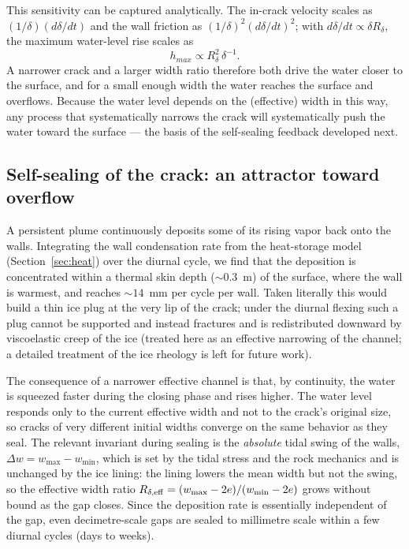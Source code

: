 \documentclass[draft]{agujournal2019}
\begin{document}
This sensitivity can be captured analytically. The in-crack velocity scales as $(1/\delta)(d\delta/dt)$ and the wall friction as $(1/\delta)^2(d\delta/dt)^2$; with $d\delta/dt\propto\delta R_\delta$, the maximum water-level rise scales as
\begin{equation}
    h_{max}\propto R_\delta^{2}\,\delta^{-1}.
    \label{eq:hmax_scaling}
\end{equation}
A narrower crack and a larger width ratio therefore both drive the water closer to the surface, and for a small enough width the water reaches the surface and overflows. Because the water level depends on the (effective) width in this way, any process that systematically narrows the crack will systematically push the water toward the surface --- the basis of the self-sealing feedback developed next.

\subsection{Self-sealing of the crack: an attractor toward overflow}
\label{sec:attractor}
A persistent plume continuously deposits some of its rising vapor back onto the walls. Integrating the wall condensation rate from the heat-storage model (Section~\ref{sec:heat}) over the diurnal cycle, we find that the deposition is concentrated within a thermal skin depth (${\sim}0.3$~m) of the surface, where the wall is warmest, and reaches ${\sim}14$~mm per cycle per wall. Taken literally this would build a thin ice plug at the very lip of the crack; under the diurnal flexing such a plug cannot be supported and instead fractures and is redistributed downward by viscoelastic creep of the ice (treated here as an effective narrowing of the channel; a detailed treatment of the ice rheology is left for future work).

The consequence of a narrower effective channel is that, by continuity, the water is squeezed faster during the closing phase and rises higher. The water level responds only to the current effective width and not to the crack's original size, so cracks of very different initial widths converge on the same behavior as they seal. The relevant invariant during sealing is the \emph{absolute} tidal swing of the walls, $\Delta w = w_{\max}-w_{\min}$, which is set by the tidal stress and the rock mechanics and is unchanged by the ice lining: the lining lowers the mean width but not the swing, so the effective width ratio $R_{\delta,\rm eff}=(w_{\max}-2e)/(w_{\min}-2e)$ grows without bound as the gap closes. Since the deposition rate is essentially independent of the gap, even decimetre-scale gaps are sealed to millimetre scale within a few diurnal cycles (days to weeks).
\end{document}
